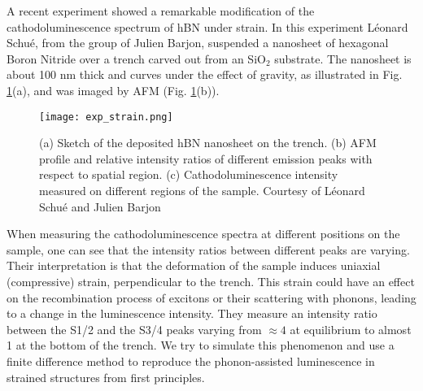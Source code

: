 A recent experiment showed a remarkable modification of the cathodoluminescence spectrum of hBN under strain. \cite{schue2017proprietes} In this experiment Léonard Schué, from the group of Julien Barjon, suspended a nanosheet of hexagonal Boron Nitride over a trench carved out from an SiO$_2$ substrate. The nanosheet is about 100 nm thick and curves under the effect of gravity, as illustrated in Fig. \ref{fig:exp_strain}(a), and was imaged by \acrfull{AFM} (Fig. \ref{fig:exp_strain}(b)).
\begin{figure}[tb]
	\vspace{0.2cm}
	\setcapindent{2em}
	\centering
	\texttt{[image: exp\_strain.png]}
	\caption{(a) Sketch of the deposited hBN nanosheet on the trench. (b) AFM profile and relative intensity ratios of different emission peaks with respect to spatial region. (c) Cathodoluminescence intensity measured on different regions of the sample. Courtesy of Léonard Schué and Julien Barjon}
	\label{fig:exp_strain} 
\end{figure}
When measuring the cathodoluminescence spectra at different positions on the sample, one can see that the intensity ratios between different peaks are varying. Their interpretation is that the deformation of the sample induces uniaxial (compressive) strain, perpendicular to the trench. This strain could have an effect on the recombination process of excitons or their scattering with phonons, leading to a change in the luminescence intensity. They measure an intensity ratio between the S1/2 and the S3/4 peaks varying from $\approx 4$ at equilibrium to almost 1 at the bottom of the trench. We try to simulate this phenomenon and use a finite difference method to reproduce the phonon-assisted luminescence in strained structures from first principles.

%
